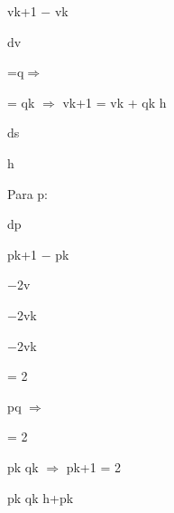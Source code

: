 \documentclass[a4paper,portrait,12pt]{article}
\begin{document}
\begin{flushleft}
vk+1 $-$ vk
\end{flushleft}


\begin{flushleft}
dv
\end{flushleft}


\begin{flushleft}
=q$\Rightarrow$
\end{flushleft}


\begin{flushleft}
= qk $\Rightarrow$ vk+1 = vk + qk h
\end{flushleft}


\begin{flushleft}
ds
\end{flushleft}


\begin{flushleft}
h
\end{flushleft}


\begin{flushleft}
Para p:
\end{flushleft}


\begin{flushleft}
dp
\end{flushleft}


\begin{flushleft}
pk+1 $-$ pk
\end{flushleft}


\begin{flushleft}
$-$2v
\end{flushleft}


\begin{flushleft}
$-$2vk
\end{flushleft}


\begin{flushleft}
$-$2vk
\end{flushleft}


= 2


\begin{flushleft}
pq $\Rightarrow$
\end{flushleft}


= 2


\begin{flushleft}
pk qk $\Rightarrow$ pk+1 = 2
\end{flushleft}


\begin{flushleft}
pk qk h+pk
\end{flushleft}
\end{document}
